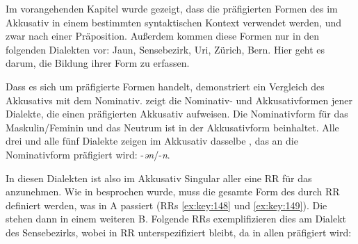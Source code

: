 Im vorangehenden Kapitel wurde gezeigt, dass die präfigierten Formen des  im Akkusativ in einem bestimmten syntaktischen Kontext verwendet werden, und zwar nach einer Präposition. Außerdem kommen diese Formen nur in den folgenden Dialekten vor: Jaun, Sensebezirk, Uri, Zürich, Bern. Hier geht es darum, die Bildung ihrer Form zu erfassen.

Dass es sich um präfigierte Formen handelt, demonstriert ein Vergleich des Akkusativs mit dem Nominativ.  zeigt die Nominativ- und Akkusativformen jener Dialekte, die einen präfigierten Akkusativ aufweisen. Die Nominativform für das Maskulin/Feminin und das Neutrum ist in der Akkusativform beinhaltet. Alle drei  und alle fünf Dialekte zeigen im Akkusativ dasselbe , das an die Nominativform präfigiert wird: -\textit{ən}/-\textit{n}.


\begin{table}
\caption{Präfigierte unbestimmte Artikel}\label{table5.32}
\end{table}

In diesen Dialekten ist also im Akkusativ Singular aller  eine RR für das  anzunehmen. Wie in  besprochen wurde, muss die gesamte Form des  durch RR definiert werden, was in  A passiert (RRs \ref{ex:key:148} und \ref{ex:key:149}). Die  stehen dann in einem weiteren  B. Folgende RRs exemplifizieren dies am Dialekt des Sensebezirks, wobei  in RR  unterspezifiziert bleibt, da in allen  präfigiert wird:

